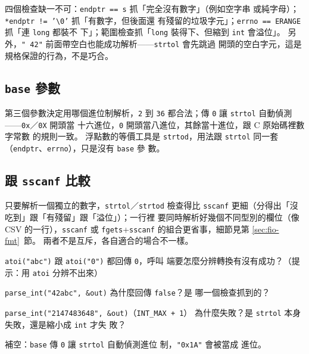 四個檢查缺一不可：\texttt{endptr == s} 抓「完全沒有數字」（例如空字串
或純字母）；\texttt{*endptr != '\textbackslash 0'} 抓「有數字，但後面還
有殘留的垃圾字元」；\texttt{errno == ERANGE} 抓「連 \texttt{long} 都裝不
下」；範圍檢查抓「\texttt{long} 裝得下、但縮到 \texttt{int} 會溢位」。
另外，\texttt{"  42"} 前面帶空白也能成功解析——\texttt{strtol} 會先跳過
開頭的空白字元，這是規格保證的行為，不是巧合。

\subsection{\texttt{base} 參數}

第三個參數決定用哪個進位制解析，\texttt{2} 到 \texttt{36} 都合法；傳
\texttt{0} 讓 \texttt{strtol} 自動偵測——\texttt{0x}／\texttt{0X} 開頭當
十六進位，\texttt{0} 開頭當八進位，其餘當十進位，跟 C 原始碼裡數字常數
的規則一致。 浮點數的等價工具是 \texttt{strtod}，用法跟 \texttt{strtol}
同一套（\texttt{endptr}、\texttt{errno}），只是沒有 \texttt{base} 參
數。

\subsection{跟 \texttt{sscanf} 比較}

只要解析一個獨立的數字，\texttt{strtol}／\texttt{strtod} 檢查得比
\texttt{sscanf} 更細（分得出「沒吃到」跟「有殘留」跟「溢位」）；一行裡
要同時解析好幾個不同型別的欄位（像 CSV 的一行），\texttt{sscanf} 或
\texttt{fgets}+\texttt{sscanf} 的組合更省事，細節見第
\ref{sec:fio-fmt}~節。 兩者不是互斥，各自適合的場合不一樣。


\begin{drills}[label=drills:sl-strtol]
\item \texttt{atoi("abc")} 跟 \texttt{atoi("0")} 都回傳 \texttt{0}，呼叫
端要怎麼分辨轉換有沒有成功？（提示：用 \texttt{atoi} 分辨不出來）
\item \texttt{parse\_int("42abc", \&out)} 為什麼回傳 \texttt{false}？是
哪一個檢查抓到的？
\item \texttt{parse\_int("2147483648", \&out)}（\texttt{INT\_MAX + 1}）
為什麼失敗？是 \texttt{strtol} 本身失敗，還是縮小成 \texttt{int} 才失
敗？
\item 補空：\texttt{base} 傳 \texttt{0} 讓 \texttt{strtol} 自動偵測進位
制，\texttt{"0x1A"} 會被當成 \underline{\hspace{2em}} 進位。
\end{drills}

